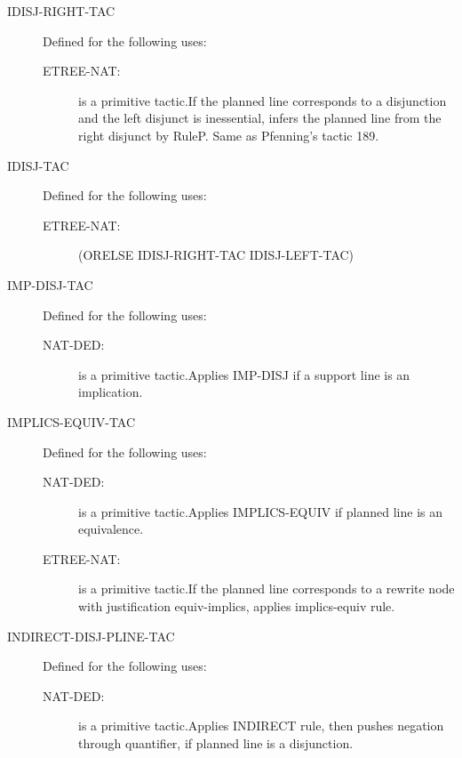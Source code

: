 \begin{description}
\begin{description}
\end{description}

\item[IDISJ-RIGHT-TAC]  Defined for the following uses:
\begin{description}
\item[ETREE-NAT:]  is a primitive tactic.If the planned line corresponds to a disjunction and the left disjunct
is inessential, infers the planned line from the right disjunct by RuleP.
Same as Pfenning's tactic 189.

\end{description}

\item[IDISJ-TAC]  Defined for the following uses:
\begin{description}
\item[ETREE-NAT:] 
(ORELSE IDISJ-RIGHT-TAC IDISJ-LEFT-TAC)


\end{description}

\item[IMP-DISJ-TAC]  Defined for the following uses:
\begin{description}
\item[NAT-DED:]  is a primitive tactic.Applies IMP-DISJ if a support line is an implication.

\end{description}

\item[IMPLICS-EQUIV-TAC]  Defined for the following uses:
\begin{description}
\item[NAT-DED:]  is a primitive tactic.Applies IMPLICS-EQUIV if planned line is an equivalence.

\item[ETREE-NAT:]  is a primitive tactic.If the planned line corresponds to a rewrite node with justification
equiv-implics, applies implics-equiv rule.

\end{description}

\item[INDIRECT-DISJ-PLINE-TAC]  Defined for the following uses:
\begin{description}
\item[NAT-DED:]  is a primitive tactic.Applies INDIRECT rule, then pushes negation through quantifier, 
if planned line is a disjunction.


\end{description}
\end{description}
